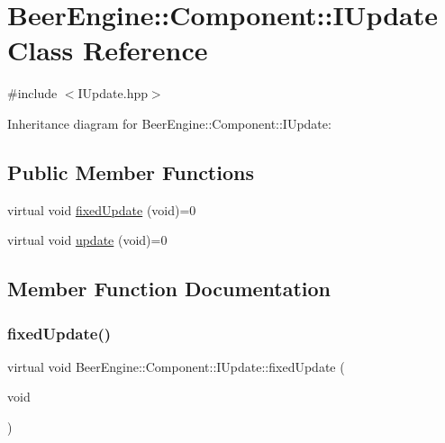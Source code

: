\hypertarget{class_beer_engine_1_1_component_1_1_i_update}{}\section{Beer\+Engine\+:\+:Component\+:\+:I\+Update Class Reference}
\label{class_beer_engine_1_1_component_1_1_i_update}


{\ttfamily \#include $<$I\+Update.\+hpp$>$}



Inheritance diagram for Beer\+Engine\+:\+:Component\+:\+:I\+Update\+:
\subsection*{Public Member Functions}
\begin{DoxyCompactItemize}
\item 
virtual void \mbox{\hyperlink{class_beer_engine_1_1_component_1_1_i_update_a615c127a4729f73713e5eaeee538854b}{fixed\+Update}} (void)=0
\item 
virtual void \mbox{\hyperlink{class_beer_engine_1_1_component_1_1_i_update_aeeda0aa303175720e449b4c51d9867dd}{update}} (void)=0
\end{DoxyCompactItemize}


\subsection{Member Function Documentation}
\mbox{\label{class_beer_engine_1_1_component_1_1_i_update_a615c127a4729f73713e5eaeee538854b}} 
\subsubsection{\texorpdfstring{fixed\+Update()}{fixedUpdate()}}
{\footnotesize\ttfamily virtual void Beer\+Engine\+::\+Component\+::\+I\+Update\+::fixed\+Update (\begin{DoxyParamCaption}\item[{void}]{ }\end{DoxyParamCaption})\hspace{0.3cm}{\ttfamily [pure virtual]}}



